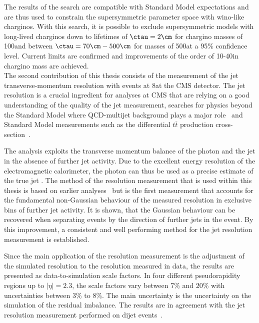 The results of the search are compatible with Standard Model expectations and are thus used to constrain the supersymmetric parameter space with wino-like charginos.
With this search, it is possible to exclude supersymmetric models with long-lived charginos down to lifetimes of $\ctau = 2\cm$ for chargino masses of 100\gev and between $\ctau = 70\cm- 500\cm$ for masses of 500\gev at a 95\% confidence level.
Current limits are confirmed and improvements of the order of 10-40\gev in chargino mass are achieved.\\

The second contribution of this thesis consists of the measurement of the jet transverse-momentum resolution with \GAMJET events at 8\tev at the CMS detector.
The jet \pt resolution is a crucial ingredient for analyses at CMS that are relying on a good understanding of the quality of the jet \pt measurement, \eg searches for physics beyond the Standard Model where QCD-multijet background plays a major role~\cite{bib:CMS:RA2_8TeV,bib:CMS:MT2_8TeV,bib:CMS:AlphaT_8TeV} and Standard Model measurements such as the differential $t\overline{t}$ production cross-section~\cite{bib:CMS:TopCrossSection_8TeV}.

The analysis exploits the transverse momentum balance of the photon and the jet in the absence of further jet activity.
Due to the excellent energy resolution of the electromagnetic calorimeter, the photon \pt can thus be used as a precise estimate of the true jet \pt.
The method of the resolution measurement that is used within this thesis is based on earlier analyses~\cite{bib:CMS:JERCPaper_2011,CMS:PAS:JETResolution_7TeV} but is the first measurement that accounts for the fundamental non-Gaussian behaviour of the measured resolution in exclusive bins of further jet activity.
It is shown, that the Gaussian behaviour can be recovered when separating events by the direction of further jets in the event.
By this improvement, a consistent and well performing method for the jet \pt resolution measurement is established.

Since the main application of the resolution measurement is the adjustment of the simulated resolution to the resolution measured in data, the results are presented as data-to-simulation scale factors.
In four different pseudorapidity regions up to $|\eta|=2.3$, the scale factors vary between 7\% and 20\% with uncertainties between 3\% to 8\%.
The main uncertainty is the uncertainty on the simulation of the residual imbalance.
The results are in agreement with the jet \pt resolution measurement performed on dijet events~\cite{bib:Kristin_Thesis}.\\

